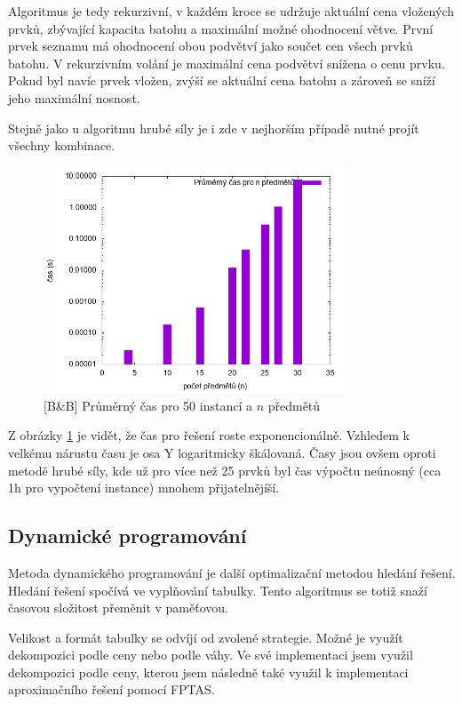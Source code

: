 \documentclass{article}
\begin{document}
Algoritmus je tedy rekurzivní, v každém kroce se udržuje aktuální cena vložených prvků, zbývající kapacita batohu a maximální možné ohodnocení větve. První prvek seznamu má ohodnocení obou podvětví jako součet cen všech prvků batohu. V rekurzivním volání je maximální cena podvětví snížena o cenu prvku. Pokud byl navíc prvek vložen, zvýší se aktuální cena batohu a zároveň se sníží jeho maximální nosnost.

Stejně jako u algoritmu hrubé síly je i zde v nejhorším případě nutné projít všechny kombinace.

\begin{figure}[ht]
    \centering
    \includegraphics[width=0.8\textwidth]{bb-duration.png}
    \caption{[B\&B] Průměrný čas pro 50 instancí a $n$ předmětů}
    \label{fig:g1}
\end{figure}

Z obrázky \ref{fig:g1} je vidět, že čas pro řešení roste exponencionálně.
Vzhledem k velkému nárustu času je osa Y logaritmicky škálovaná.
Časy jsou ovšem oproti metodě hrubé síly, kde už pro více než 25 prvků byl čas výpočtu neúnosný (cca 1h pro vypočtení instance) mnohem přijatelnějíší.

\subsection*{Dynamické programování}

Metoda dynamického programování je další optimalizační metodou hledání řešení.
Hledání řešení spočívá ve vyplňování tabulky.
Tento algoritmus se totiž snaží časovou složitost přeměnit v paměťovou.

Velikost a formát tabulky se odvíjí od zvolené strategie.
Možné je využít dekompozici podle ceny nebo podle váhy.
Ve své implementaci jsem využil dekompozici podle ceny, kterou jsem následně také využil k implementaci aproximačního řešení pomocí FPTAS.
\end{document}
